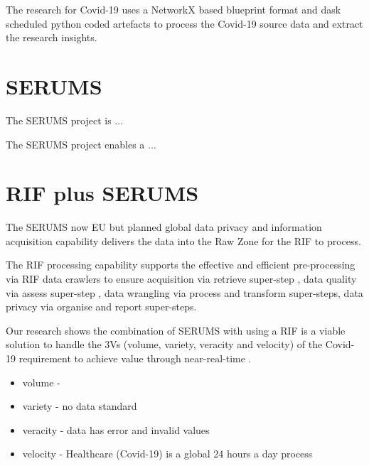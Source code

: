 The research for Covid-19 uses a NetworkX based blueprint format and dask scheduled python coded artefacts to process the Covid-19 source data and extract the research insights.

\section{SERUMS}

The SERUMS project is ...

The SERUMS project enables a ...

{\color{red}{AF:
We need a SERUMS summary here!!
}}

{\color{red}{VJ: I can do this, should be relatively easy to pull out from other SERUMS papers that we have}}



\section{RIF plus SERUMS}

The SERUMS now EU but planned global data privacy and information acquisition capability delivers the data into the Raw Zone for the RIF to process.

The RIF processing capability supports the effective and efficient pre-processing via RIF data crawlers to ensure acquisition via retrieve super-step \cite{Vermeulen2018ret} , data quality via assess super-step \cite{Vermeulen2018ass}, data wrangling via process \cite{Vermeulen2018prc} and transform \cite{Vermeulen2018trf} super-steps, data privacy via organise and report super-steps.

Our research shows the combination of SERUMS with using a RIF is a viable solution to handle the 3Vs (volume, variety, veracity and velocity) of the Covid-19 requirement to achieve value through near-real-time .

\begin{itemize}
    \item volume - 
    \item variety - no data standard
    \item veracity - data has error and invalid values
    \item velocity - Healthcare (Covid-19) is a global 24 hours a day process
\end{itemize}